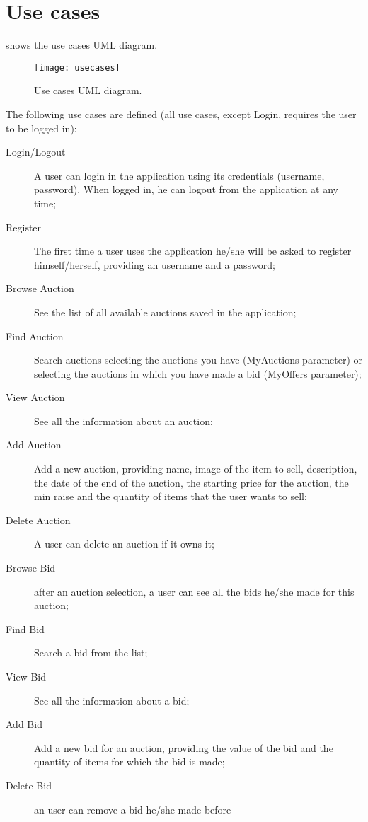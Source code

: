 \chapter{Use cases}\label{ch:usecases}

 shows the use cases UML diagram.

\begin{figure}[p]
	\texttt{[image: usecases]}
	\caption{Use cases UML diagram.}\label{fig:usecases}
\end{figure}

The following use cases are defined (all use cases, except Login, requires the
user to be logged in):

\begin{description}
	\item[Login/Logout] A user can login in the application using its
		credentials (username, password). When logged in, he can logout
		from the application at any time;
	\item[Register] The first time a user uses the application he/she will
		be asked to register himself/herself, providing an username and
		a password;
	\item[Browse Auction] See the list of all available auctions saved in
		the application;
	\item[Find Auction] Search auctions selecting the auctions you have
		(MyAuctions parameter) or selecting the auctions in which you
		have made a bid (MyOffers parameter);
	\item[View Auction] See all the information about an auction;
	\item[Add Auction] Add a new auction, providing name, image of the item
		to sell, description, the date of the end of the auction, the
		starting price for the auction, the min raise and the quantity
		of items that the user wants to sell;
	\item[Delete Auction] A user can delete an auction if it owns it;
	\item[Browse Bid] after an auction selection, a user can see all the
		bids he/she made for this auction;
	\item[Find Bid] Search a bid from the list;
	\item[View Bid] See all the information about a bid;
	\item[Add Bid] Add a new bid for an auction, providing the value of the
		bid and the quantity of items for which the bid is made;
	\item[Delete Bid] an user can remove a bid he/she made before
\end{description}
